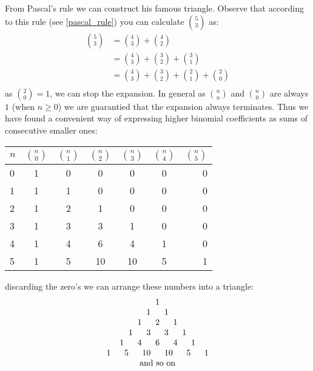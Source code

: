 \myindent From Pascal's rule we can construct his famous triangle. Observe that according to this rule (see \ref{pascal_rule}) you can calculate $\binom{5}{3}$ as:
\begin{align*}
 \binom{5}{3}
& =  \binom{4}{3} + \binom{4}{2}  \\
& =  \binom{4}{3} + \binom{3}{2} +  \binom{3}{1} \\
& =  \binom{4}{3} + \binom{3}{2} +  \binom{2}{1} + \binom{2}{0} \\
\end{align*}
as $\binom{2}{0} = 1$, we can stop the expansion. In general as $\binom{n}{n}$ and $\binom{n}{0}$ are always
$1$ (when $n \geq 0$) we are guarantied that the expansion always terminates. Thus we have found a convenient way of
expressing higher binomial coefficients as sums of consecutive smaller ones:\\ 
\begin{center}
\begin{tabular}{l|*{5}{c}r}
\toprule
$n$ & $\binom{n}{0}$        & $\binom{n}{1}$ & $\binom{n}{2}$ & $\binom{n}{3}$ & $\binom{n}{4}$  & $\binom{n}{5}$ \\
\hline
0		& 1                     & 0 			       & 0 			        & 0 			       & 0 			         & 0   \\
1   & 1                     & 1 			       & 0 			        & 0 			       & 0  			       & 0   \\
2   & 1                     & 2 			       & 1 			        & 0 			       & 0  			       & 0   \\
3		& 1                     & 3 			       & 3 			        & 1			         & 0  			       & 0   \\
4		& 1                     & 4 			       & 6 			        & 4			         & 1  			       & 0   \\
5		& 1                     & 5 			       & 10 			      & 10			       & 5  			       & 1   \\
\bottomrule
\end{tabular}
\end{center}
discarding the zero's we can arrange these numbers into a triangle: 
\[
\begin{array}{c} 
1 \\ 
1\ \hspace{0.45cm} 1\\ 
1\ \hspace{0.45cm} 2\ \hspace{0.45cm} 1   \\ 
1\ \hspace{0.45cm} 3\ \hspace{0.45cm} 3\   \hspace{0.45cm} 1   \\ 
1\ \hspace{0.45cm} 4\ \hspace{0.45cm} 6\   \hspace{0.45cm} 4\   \hspace{0.45cm} 1\\ 
1\ \hspace{0.45cm} 5\ \hspace{0.45cm} 10\ \hspace{0.45cm} 10\ \hspace{0.45cm} 5\ \hspace{0.45cm}1\\
\ \textnormal{and so on} \ \\
\end{array} 
\] 
